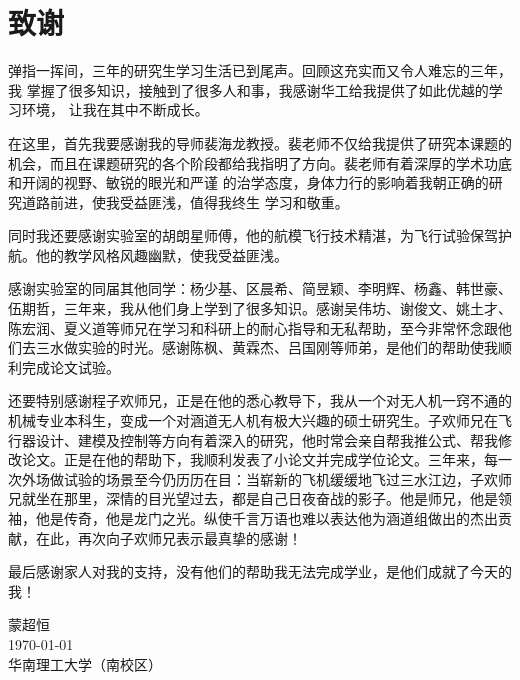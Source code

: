 \chapter{致谢}
%
弹指一挥间，三年的研究生学习生活已到尾声。回顾这充实而又令人难忘的三年，我
掌握了很多知识，接触到了很多人和事，我感谢华工给我提供了如此优越的学习环境，
让我在其中不断成长。

在这里，首先我要感谢我的导师裴海龙教授。裴老师不仅给我提供了研究本课题的
机会，而且在课题研究的各个阶段都给我指明了方向。裴老师有着深厚的学术功底和开阔的视野、敏锐的眼光和严谨
的治学态度，身体力行的影响着我朝正确的研究道路前进，使我受益匪浅，值得我终生
学习和敬重。

同时我还要感谢实验室的胡朗星师傅，他的航模飞行技术精湛，为飞行试验保驾护航。他的教学风格风趣幽默，使我受益匪浅。

感谢实验室的同届其他同学：杨少基、区晨希、简昱颖、李明辉、杨鑫、韩世豪、伍期哲，三年来，我从他们身上学到了很多知识。感谢吴伟坊、谢俊文、姚土才、陈宏润、夏义道等师兄在学习和科研上的耐心指导和无私帮助，至今非常怀念跟他们去三水做实验的时光。感谢陈枫、黄霖杰、吕国刚等师弟，是他们的帮助使我顺利完成论文试验。

还要特别感谢程子欢师兄，正是在他的悉心教导下，我从一个对无人机一窍不通的机械专业本科生，变成一个对涵道无人机有极大兴趣的硕士研究生。子欢师兄在飞行器设计、建模及控制等方向有着深入的研究，他时常会亲自帮我推公式、帮我修改论文。正是在他的帮助下，我顺利发表了小论文并完成学位论文。三年来，每一次外场做试验的场景至今仍历历在目：当崭新的飞机缓缓地飞过三水江边，子欢师兄就坐在那里，深情的目光望过去，都是自己日夜奋战的影子。他是师兄，他是领袖，他是传奇，他是龙门之光。纵使千言万语也难以表达他为涵道组做出的杰出贡献，在此，再次向子欢师兄表示最真挚的感谢！

最后感谢家人对我的支持，没有他们的帮助我无法完成学业，是他们成就了今天的我！
~\\

\begin{minipage}[t]{0.945\textwidth}%
	\begin{flushright}
		蒙超恒\\
		\today\\
		华南理工大学（南校区）%
		\par\end{flushright}
\end{minipage}

\cleardoublepage 